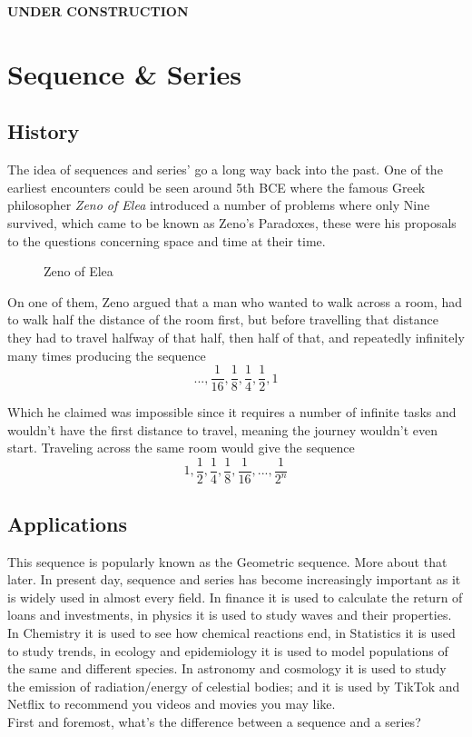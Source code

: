 \documentclass[
  letterpaper,
  DIV=11,
  numbers=noendperiod]{scrreprt}
\makeatletter
\newcommand*\pandocbounded[1]{%
  \sbox\pandoc@box{#1}%
  \Gscale@div\@tempa{\textheight}{\dimexpr\ht\pandoc@box+\dp\pandoc@box\relax}%
  \Gscale@div\@tempb{\linewidth}{\wd\pandoc@box}%
  \ifdim\@tempb\p@<\@tempa\p@\let\@tempa\@tempb\fi%
  \ifdim\@tempa\p@<\p@\scalebox{\@tempa}{\usebox\pandoc@box}%
  \else\usebox{\pandoc@box}%
  \fi%
}
\makeatother
\begin{document}

\textbf{UNDER CONSTRUCTION}


\chapter{Sequence \& Series}\label{sequence-series}

\section{History}\label{history-1}

The idea of sequences and series' go a long way back into the past. One
of the earliest encounters could be seen around 5th BCE where the famous
Greek philosopher \emph{Zeno of Elea} introduced a number of problems
where only Nine survived, which came to be known as Zeno's Paradoxes,
these were his proposals to the questions concerning space and time at
their time.

\begin{figure}[H]

{\centering \pandocbounded{\texttt{[image: images/ZenoVanElea.jpg]}}

}

\caption{Zeno of Elea}

\end{figure}%

On one of them, Zeno argued that a man who wanted to walk across a room,
had to walk half the distance of the room first, but before travelling
that distance they had to travel halfway of that half, then half of
that, and repeatedly infinitely many times producing the sequence \[
...,\frac{1}{16},\frac{1}{8},\frac{1}{4},\frac{1}{2},1
\]

Which he claimed was impossible since it requires a number of infinite
tasks and wouldn't have the first distance to travel, meaning the
journey wouldn't even start. Traveling across the same room would give
the sequence \[
1,\frac{1}{2},\frac{1}{4},\frac{1}{8},\frac{1}{16},...,\frac{1}{2^n}
\]

\section{Applications}\label{applications-1}

This sequence is popularly known as the Geometric sequence. More about
that later. In present day, sequence and series has become increasingly
important as it is widely used in almost every field. In finance it is
used to calculate the return of loans and investments, in physics it is
used to study waves and their properties. In Chemistry it is used to see
how chemical reactions end, in Statistics it is used to study trends, in
ecology and epidemiology it is used to model populations of the same and
different species. In astronomy and cosmology it is used to study the
emission of radiation/energy of celestial bodies; and it is used by
TikTok and Netflix to recommend you videos and movies you may like.\\
First and foremost, what's the difference between a sequence and a
series?
\end{document}
